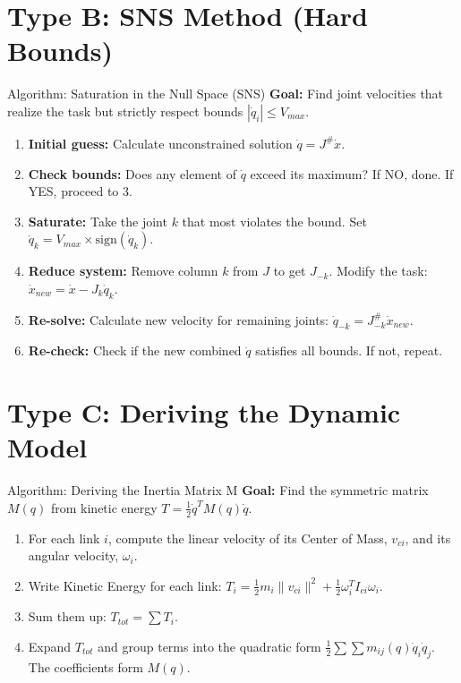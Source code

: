 \documentclass[11pt,a4paper]{article}
\begin{document}
\section{Type B: SNS Method (Hard Bounds)}

{Algorithm: Saturation in the Null Space (SNS)}
\textbf{Goal:} Find joint velocities that realize the task but strictly respect bounds $|\dot{q}_i| \leq V_{max}$.
\begin{enumerate}
    \item \textbf{Initial guess:} Calculate unconstrained solution $\dot{q} = J^\# \dot{x}$.
    \item \textbf{Check bounds:} Does any element of $\dot{q}$ exceed its maximum? If NO, done. If YES, proceed to 3.
    \item \textbf{Saturate:} Take the joint $k$ that most violates the bound. Set $\dot{q}_k = V_{max} \times \text{sign}(\dot{q}_k)$.
    \item \textbf{Reduce system:} Remove column $k$ from $J$ to get $J_{-k}$. Modify the task: $\dot{x}_{new} = \dot{x} - J_k \dot{q}_k$.
    \item \textbf{Re-solve:} Calculate new velocity for remaining joints: $\dot{q}_{-k} = J_{-k}^\# \dot{x}_{new}$.
    \item \textbf{Re-check:} Check if the new combined $\dot{q}$ satisfies all bounds. If not, repeat.
\end{enumerate}

\section{Type C: Deriving the Dynamic Model}

{Algorithm: Deriving the Inertia Matrix M}
\textbf{Goal:} Find the symmetric matrix $M(q)$ from kinetic energy $T = \frac{1}{2}\dot{q}^T M(q) \dot{q}$.
\begin{enumerate}
    \item For each link $i$, compute the linear velocity of its Center of Mass, $v_{ci}$, and its angular velocity, $\omega_i$.
    \item Write Kinetic Energy for each link: $T_i = \frac{1}{2}m_i \|v_{ci}\|^2 + \frac{1}{2}\omega_i^T I_{ci} \omega_i$.
    \item Sum them up: $T_{tot} = \sum T_i$.
    \item Expand $T_{tot}$ and group terms into the quadratic form $\frac{1}{2} \sum \sum m_{ij}(q)\dot{q}_i \dot{q}_j$. The coefficients form $M(q)$.
\end{enumerate}
\end{document}
